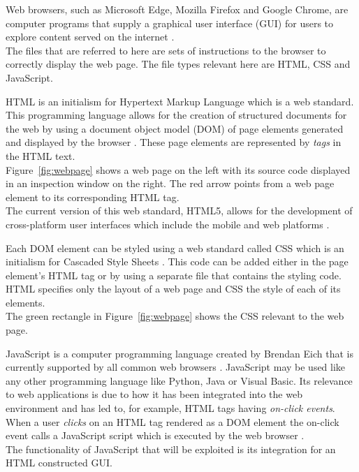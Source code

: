 \documentclass[a4paper,12pt]{article}
\begin{document}
Web browsers, such as Microsoft Edge, Mozilla Firefox and Google Chrome, are computer programs that supply a graphical user interface (GUI) for users to explore content served on the internet \citep{itl}.\\The files that are referred to here are sets of instructions to the browser to correctly display the web page. The file types relevant here are HTML, CSS and JavaScript.

HTML is an initialism for Hypertext Markup Language which is a web standard. This programming language allows for the creation of structured documents for the web by using a document object model (DOM) of page elements generated and displayed by the browser \citep{larsen}. These page elements are represented by \emph{tags} in the HTML text.\\Figure~\ref{fig:webpage} shows a web page on the left with its source code displayed in an inspection window on the right. The red arrow points from a web page element to its corresponding HTML tag.\\The current version of this web standard, HTML5, allows for the development of cross-platform user interfaces which include the mobile and web platforms \citep{larsen}.

Each DOM element can be styled using a web standard called CSS which is an initialism for Cascaded Style Sheets \citep{larsen}. This code can be added either in the page element's HTML tag or by using a separate file that contains the styling code.\\HTML specifies only the layout of a web page and CSS the style of each of its elements.\\The green rectangle in Figure~\ref{fig:webpage} shows the CSS relevant to the web page.

JavaScript is a computer programming language created by Brendan Eich that is currently supported by all common web browsers \citep{rauschmayer}. JavaScript may be used like any other programming language like Python, Java or Visual Basic. Its relevance to web applications is due to how it has been integrated into the web environment and has led to, for example, HTML tags having \emph{on-click events}. When a user \emph{clicks} on an HTML tag rendered as a DOM element the on-click event calls a JavaScript script which is executed by the web browser \citep{rauschmayer}.\\The functionality of JavaScript that will be exploited is its integration for an HTML constructed GUI.
\end{document}
